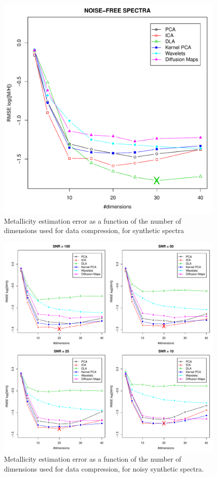 \documentclass[a4paper,fleqn,usenatbib]{mnras}
\begin{document}
\begin{figure}
\centering\includegraphics[width=\columnwidth]{flamesHR10_SNR=000_Meta_log_BestSVM_N-RMSE_test.pdf}
\caption{Metallicity estimation error as a function of the number of
  dimensions used for data compression, for synthetic spectra}
\label{fig:05}
\end{figure}

\begin{figure}
\centering\includegraphics[width=\textwidth]{flamesHR10_Meta_log_BestSVM_N-RMSE_test.pdf}
\caption{Metallicity estimation error as a function of the number of
  dimensions used for data compression, for noisy synthetic
  spectra.}
\label{fig:06}
\end{figure}
\end{document}
